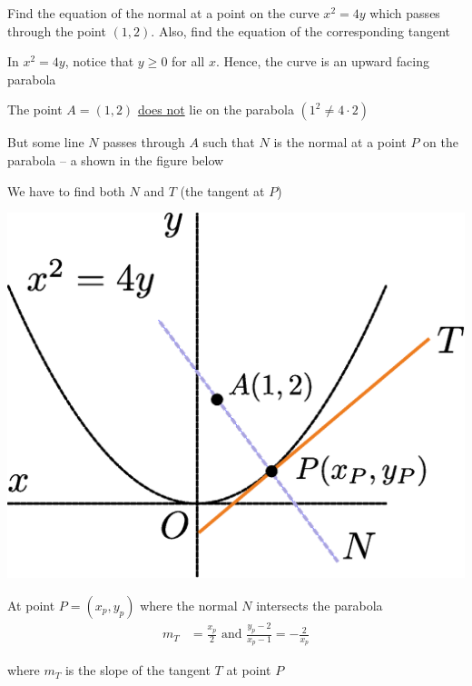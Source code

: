 \documentclass[14pt,fleqn]{extarticle}
\begin{document}
\newcommand\ptp{ \left(x_p,y_p \right)}
\newcommand\xp{x_P}
\newcommand\xps{{\xp}^2}

Find the equation of the normal at a point
on the curve $x^2=4y$ which passes
through the point $(1,2)$. Also, find the
equation of the corresponding tangent
%

\newcard 

In $x^2 = 4y$, notice that $y \geq 0$ for all $x$. Hence, the curve is an upward facing parabola \newline 

The point $A = \left(1,2 \right)$ \underline{does not} lie on the parabola $\left(1^2 \neq 4\cdot 2 \right)$ \newline 

But some line $N$ passes through $A$ such that $N$ is the normal at a point $P$ on the parabola -- a shown in the figure below \newline 

We have to find both $N$ and $T$ (the tangent at $P$) 

\begin{center}
\includegraphics[scale=0.35]{fig-1.eps} 
\end{center}

\newcard

At point $P = \ptp$ where the normal $N$ intersects the parabola 
\begin{align}
m_T &= \frac{x_p}{2}\text{ and } \frac{y_p-2}{x_p-1} = -\frac{2}{x_p}
\end{align}

where $m_T$ is the slope of the tangent $T$ at point $P$ 
\end{document}
